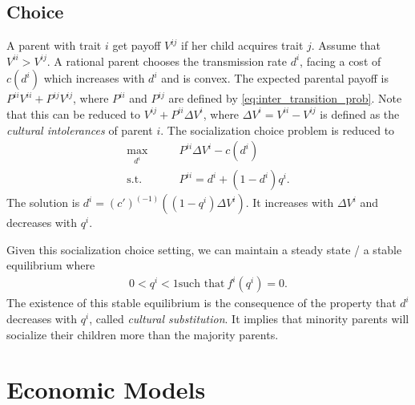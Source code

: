 \documentclass[12pt]{article}
\begin{document}
\subsection{Choice}
A parent with trait $i$ get payoff $V^{ij}$ if her child acquires trait $j$. Assume that $V^{ii}>V^{ij}$. A rational parent chooses the transmission rate $d^i$, facing a cost of $c(d^i)$ which increases with $d^i$ and is convex. The expected parental payoff is $P^{ii}V^{ii}+P^{ij}V^{ij}$, where $P^{ii}$ and $P^{ij}$ are defined by \eqref{eq:inter_transition_prob}. Note that this can be reduced to $V^{ij}+P^{ii}\Delta V^i$, where $\Delta V^i = V^{ii} - V^{ij}$ is defined as the \textit{cultural intolerances} of parent $i$. The socialization choice problem is reduced to
\begin{align}
    \max_{d^i} \qquad& P^{ii} \Delta V^i - c(d^i) \label{opt:socialization_choice} \\
    \text{s.t.} \qquad & P^{ii} = d^i + (1-d^i) q^i. \nonumber
\end{align}
The solution is $d^i = (c')^{(-1)}\left((1-q^i)\Delta V^i\right)$. It increases with $\Delta V^i$ and decreases with $q^i$. 

Given this socialization choice setting, we can maintain a steady state / a stable equilibrium where
\begin{align}
    0 < q^i < 1 \text{such that}\ f^i(q^i)=0. \label{eq:eqm_cond}
\end{align}
The existence of this stable equilibrium is the consequence of the property that $d^i$ decreases with $q^i$, called \textit{cultural substitution}. It implies that minority parents will socialize their children more than the majority parents.

\section{Economic Models}
\end{document}
